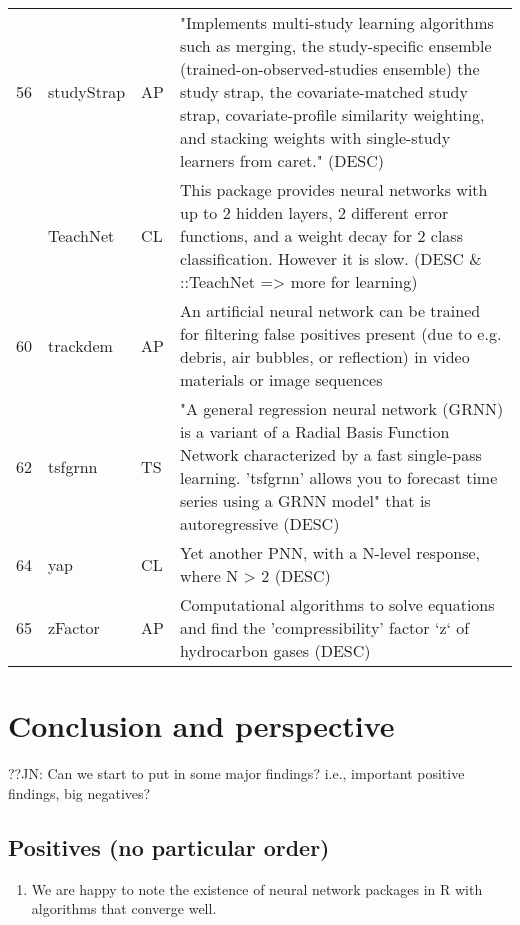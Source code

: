 \begin{Schunk}
\begin{longtable}[t]{lll>{\raggedright\arraybackslash}p{10cm}}
56 & studyStrap & AP & "Implements multi-study learning algorithms such as merging, the study-specific ensemble (trained-on-observed-studies ensemble) the study strap, the covariate-matched study strap, covariate-profile similarity weighting, and stacking weights with single-study learners from caret." (DESC)\\
\addlinespace
57 & TeachNet & CL & This package provides neural networks with up to 2 hidden layers, 2 different error functions, and a weight decay for 2 class classification. However it is slow. (DESC \& ::TeachNet => more for learning)\\
60 & trackdem & AP & An artificial neural network can be trained for filtering false positives present (due to e.g. debris, air bubbles, or reflection) in video materials or image sequences\\
62 & tsfgrnn & TS & "A general regression neural network (GRNN) is a variant of a Radial Basis Function Network characterized by a fast single-pass learning. 'tsfgrnn' allows you to forecast time series using a GRNN model" that is autoregressive (DESC)\\
64 & yap & CL & Yet another PNN, with a N-level response, where N > 2 (DESC)\\
65 & zFactor & AP & Computational algorithms to solve equations and find the 'compressibility' factor `z` of hydrocarbon gases (DESC)\\
\bottomrule
\end{longtable}
\endgroup{}

\end{Schunk}

\hypertarget{conclusion-and-perspective}{%
\section{Conclusion and perspective}\label{conclusion-and-perspective}}

??JN: Can we start to put in some major findings? i.e., important
positive findings, big negatives?

\hypertarget{positives-no-particular-order}{%
\subsection{Positives (no particular
order)}\label{positives-no-particular-order}}

\begin{enumerate}
\def\labelenumi{\arabic{enumi}.}
\tightlist
\item
  We are happy to note the existence of neural network packages in R
  with algorithms that converge well.
\end{enumerate}


